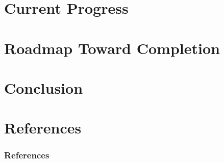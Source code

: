 \documentclass{beamer}
\begin{document}


\section{Current Progress}



\section{Roadmap Toward Completion}


\section{Conclusion}


\section{References}

\begin{frame}[allowframebreaks]
\frametitle{References}




\end{frame}

\end{document}
